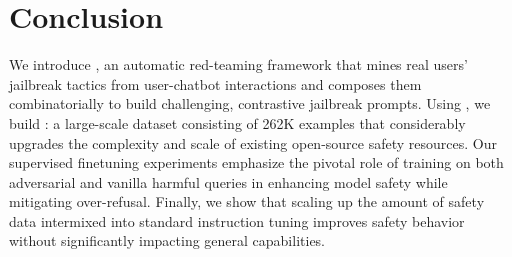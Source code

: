 \section{Conclusion}

We introduce \method, an automatic red-teaming framework that mines real users' jailbreak tactics from user-chatbot interactions and composes them combinatorially to build challenging, contrastive jailbreak prompts. Using \method, we build \dataset: a large-scale dataset consisting of 262K examples that considerably upgrades the complexity and scale of existing open-source safety resources. Our supervised finetuning experiments emphasize the pivotal role of training on both adversarial and vanilla harmful queries in enhancing model safety while mitigating over-refusal. Finally, we show that scaling up the amount of safety data intermixed into standard instruction tuning improves safety behavior without significantly impacting general capabilities. 
